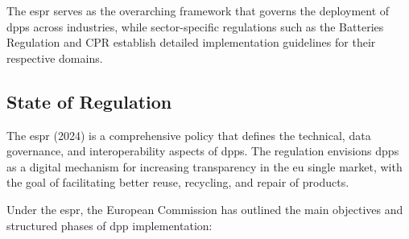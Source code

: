 The \ac{espr} serves as the overarching framework that governs the deployment of \ac{dpp}s across industries, while sector-specific regulations such as the Batteries Regulation and CPR establish detailed implementation guidelines for their respective domains.

\subsection{State of Regulation}

The \ac{espr} (2024) is a comprehensive policy that defines the technical, data governance, and interoperability aspects of \ac{dpp}s. The regulation envisions \ac{dpp}s as a digital mechanism for increasing transparency in the \ac{eu} single market, with the goal of facilitating better reuse, recycling, and repair of products. \autocite[1781]{EuropeanParliamentandCouncil.2024}

Under the \ac{espr}, the European Commission has outlined the main objectives and structured phases of \ac{dpp} implementation:

